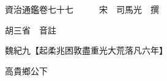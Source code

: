 










 


 
 


 

  
  
  
  
  





  
  
  
  
  
 
  

  

  
  
  



  

 
 

  
   




  

  
  


  　　資治通鑑卷七十七　　　宋　司馬光　撰

　　胡三省　音註

　　魏紀九【起柔兆困敦盡重光大荒落凡六年】

　　高貴鄉公下

